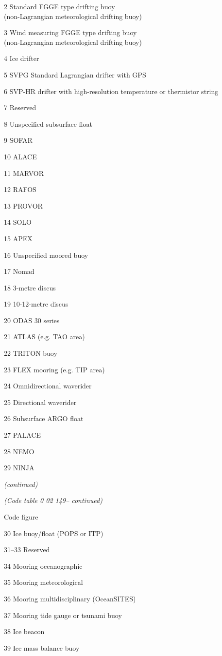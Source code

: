 2 Standard FGGE type drifting buoy\\
(non-Lagrangian meteorological drifting buoy)

3 Wind measuring FGGE type drifting buoy\\
(non-Lagrangian meteorological drifting buoy)

4 Ice drifter

5 SVPG Standard Lagrangian drifter with GPS

6 SVP-HR drifter with high-resolution temperature or thermistor string

7 Reserved

8 Unspecified subsurface float

9 SOFAR

10 ALACE

11 MARVOR

12 RAFOS

13 PROVOR

14 SOLO

15 APEX

16 Unspecified moored buoy

17 Nomad

18 3-metre discus

19 10-12-metre discus

20 ODAS 30 series

21 ATLAS (e.g. TAO area)

22 TRITON buoy

23 FLEX mooring (e.g. TIP area)

24 Omnidirectional waverider

25 Directional waverider

26 Subsurface ARGO float

27 PALACE

28 NEMO

29 NINJA

\emph{(continued)}

\emph{(Code table 0 02 149-- continued)}

Code figure

30 Ice buoy/float (POPS or ITP)

31--33 Reserved

34 Mooring oceanographic

35 Mooring meteorological

36 Mooring multidisciplinary (OceanSITES)

37 Mooring tide gauge or tsunami buoy

38 Ice beacon

39 Ice mass balance buoy

